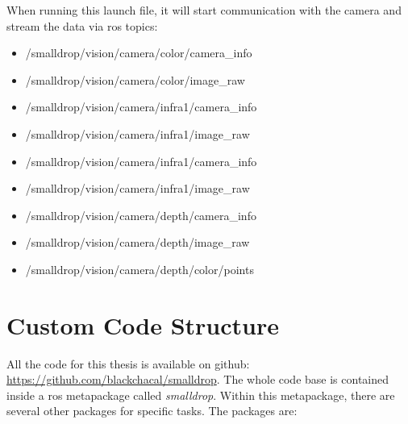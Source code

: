When running this launch file, it will start communication with the camera and stream the data via \gls{ros} topics:

\begin{itemize}
    \item /smalldrop/vision/camera/color/camera\_info
    \item /smalldrop/vision/camera/color/image\_raw
    \item /smalldrop/vision/camera/infra1/camera\_info
    \item /smalldrop/vision/camera/infra1/image\_raw
    \item /smalldrop/vision/camera/infra1/camera\_info
    \item /smalldrop/vision/camera/infra1/image\_raw
    \item /smalldrop/vision/camera/depth/camera\_info
    \item /smalldrop/vision/camera/depth/image\_raw
    \item /smalldrop/vision/camera/depth/color/points
\end{itemize}



\section{Custom Code Structure}
\label{sec:ros_setup_custom_code}

All the code for this thesis is available on github: \url{https://github.com/blackchacal/smalldrop}. The whole code base is contained inside a \gls{ros} metapackage called \textit{smalldrop}. Within this metapackage, there are several other packages for specific tasks. The packages are:

